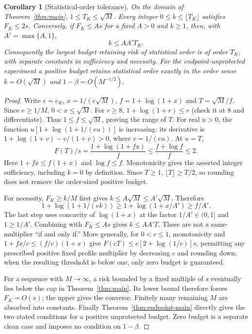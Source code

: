 \documentclass[11pt]{article}
\newtheorem{corollary}[theorem]{Corollary}
\theoremstyle{remark}\newtheorem{remark}[theorem]{Remark}
\newcommand{\1}{\mathbf 1}
\begin{document}
\begin{corollary}[Statistical-order tolerance]\label{cor:tolerance}
On the domain of Theorem~\ref{thm:main}, $1\le T_K\le\sqrt M$.
Every integer $0\le k\le\lfloor T_K\rfloor$ satisfies $F_K\le2s$.
Conversely, if $F_K\le A s$ for a fixed $A>0$ and $k\ge1$, then, with $A'=\max\{A,1\}$,
\[
 k\le A A' T_K.
\]
Consequently the largest budget retaining risk of statistical order is of order $T_K$, with separate constants in sufficiency and necessity. For the endpoint-unprotected experiment a positive budget retains statistical order exactly in the order sense $k=O(\sqrt M)$ and $1-\beta=O(M^{-1/2})$.
\end{corollary}
\begin{proof}
Write $e=e_K$, $x=1/(e\sqrt M)$, $f=1+\log(1+x)$ and $T=\sqrt M/f$. Since $e\ge1/M$, $0<x\le\sqrt M$. For $r\ge8$, $1+\log(1+r)\le r$ (check it at $8$ and differentiate). Thus $1\le f\le\sqrt M$, proving the range of $T$.
For real $u>0$, the function $u[1+\log(1+1/(eu))]$ is increasing: its derivative is $1+\log(1+v)-v/(1+v)>0$, where $v=1/(eu)$. At $u=T$,
\[
 F(T)/s=\frac{1+\log(1+fx)}{f}
 \le\frac{f+\log f}{f}\le2.
\]
Here $1+fx\le f(1+x)$ and $\log f\le f$. Monotonicity gives the asserted integer sufficiency, including $k=0$ by definition. Since $T\ge1$, $\lfloor T\rfloor\ge T/2$, so rounding does not remove the order-sized positive budget.

For necessity, $F_K\ge k/M$ first gives $k\le A\sqrt M\le A'\sqrt M$. Therefore
\[
 1+\log(1+1/(ek))\ge1+\log(1+x/A')\ge f/A'.
\]
The last step uses concavity of $\log(1+x)$ at the factor $1/A'\in(0,1]$ and $1\ge1/A'$. Combining with $F_K\le As$ gives $k\le AA'T$. These are not a same-multiplier ``if and only if.'' More generally, for $0<c\le1$, monotonicity and $1+fx/c\le(f/c)(1+x)$ give $F(cT)\le c[2+\log(1/c)]s$, permitting any prescribed positive fixed profile multiplier by decreasing $c$ and rounding down; when the resulting threshold is below one, only zero budget is guaranteed.

For a sequence with $M\to\infty$, a risk bounded by a fixed multiple of $s$ eventually lies below the cap in Theorem~\ref{thm:main}. Its lower bound therefore forces $F_K=O(s)$; the upper gives the converse. Finitely many remaining $M$ are absorbed into constants. Finally Theorem~\ref{thm:endpoint-main} directly gives the two stated conditions for a positive unprotected budget. Zero budget is a separate clean case and imposes no condition on $1-\beta$.
\end{proof}
\end{document}
